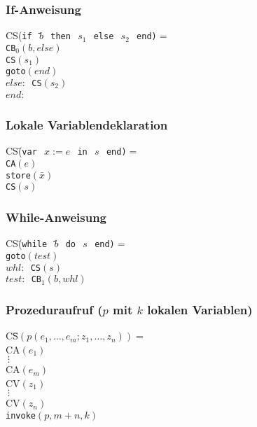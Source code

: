 \documentclass[german,10pt, a4paper, twocolumn]{scrartcl}
\theoremstyle{definition}
\theoremstyle{remark}
\begin{document}
\subsubsection{If-Anweisung}

\begin{tabbing}
 CS(\tt{if} \=$\ b\ $ \tt{then} $\ s_1\ $ \tt{else} $\ s_2\ $ \tt{end})$ =$ \\
 \>	CB$_0(b, else)$\\
 \>	CS$(s_1)$\\
 \>	\tt{goto}$(end)$\\
 $else:$\>	CS$(s_2)$\\
 $end:$
\end{tabbing}

\subsubsection{Lokale Variablendeklaration}

\begin{tabbing}
 CS\=(\tt{var} $\ x:=e\ $ \tt{in} $\ s\ $ \tt{end})$ =$ \\
 \>	CA$(e)$\\
 \>	\tt{store}$(\bar{x})$\\
 \>	CS$(s)$
\end{tabbing}

\subsubsection{While-Anweisung}

\begin{tabbing}
 CS\=(\tt{while} \=$\ b\ $ \tt{do} $\ s\ $ \tt{end})$ =$ \\
 \>	\>	\tt{goto}$(test)$\\
 \>	$whl:$	\>	CS$(s)$\\
 \>	$test:$	\>	CB$_1(b,whl)$
\end{tabbing}

\subsubsection{Prozeduraufruf ($p$ mit $k$ lokalen Variablen)}

\begin{tabbing}
 CS\=$(p(e_1,\ldots,e_m;z_1,\ldots,z_n)) =$ \\
 \>	CA$(e_1)$\\
 \>	$\ \vdots$\\
 \>	CA$(e_m)$\\
 \>	CV$(z_1)$\\
 \>	$\ \vdots$\\
 \>	CV$(z_n)$\\
 \>	\tt{invoke}$(p,m+n,k)$
\end{tabbing}
\end{document}
